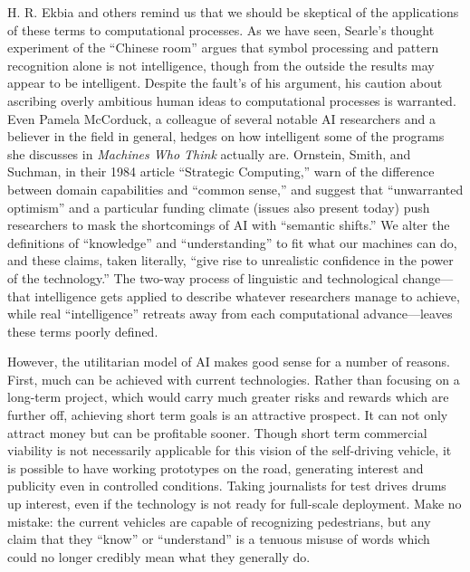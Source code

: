 H. R. Ekbia\cite{???} and others remind us that we should be skeptical of the
applications of these terms to computational processes. As we have
seen, Searle's thought experiment of the “Chinese room”
argues that symbol processing and pattern recognition alone is not
intelligence, though from the outside the results may appear to be
intelligent. Despite the fault's of his argument, his caution
about ascribing overly ambitious human ideas to computational
processes is warranted. Even Pamela McCorduck, a colleague of several
notable AI researchers and a believer in the field in general, hedges
on how intelligent some of the programs she discusses in \emph{Machines Who
Think} actually are. Ornstein, Smith, and Suchman, in their 1984
article ``Strategic Computing,'' warn of the difference between domain
capabilities and ``common sense,'' and suggest that ``unwarranted
optimism'' and a particular funding climate (issues also present today)
push researchers to mask the shortcomings of AI with ``semantic
shifts.''\cite{???} We alter the definitions of ``knowledge'' and ``understanding''
to fit what our machines can do, and these claims, taken literally,
``give rise to unrealistic confidence in the power of the technology.''\cite{???}
The two-way process of linguistic and technological change---that
intelligence gets applied to describe whatever researchers manage to
achieve, while real ``intelligence'' retreats away from each
computational advance---leaves these terms poorly defined.

However, the utilitarian model of AI makes good sense for a number of reasons.
First, much can be achieved with current technologies. Rather than
focusing on a long-term project, which would carry much greater risks
and rewards which are further off, achieving short term goals is an
attractive prospect. It can not only attract money but can be
profitable sooner. Though short term commercial viability is not
necessarily applicable for this vision of the self-driving vehicle, it
is possible to have working prototypes on the road, generating
interest and publicity even in controlled conditions. Taking
journalists for test drives drums up interest, even if the technology
is not ready for full-scale deployment. Make no mistake: the current
vehicles are capable of recognizing pedestrians, but any claim that
they ``know'' or ``understand'' is a tenuous misuse of words which
could no longer credibly mean what they generally do. 

